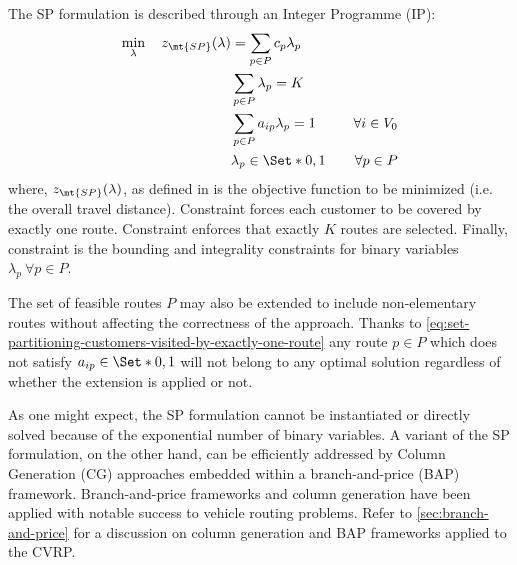 The SP formulation is described through an Integer Programme (IP):
\begin{align}
	\min_{\lambda} \quad z_\mt{SP}(\lambda) & = \sum_{p \in P}  c_p \lambda_p              & \label{eq:set-partitioning-obj-func}                                                       \\
	                                        & \sum_{p \in P} \lambda_{p} = K               & \label{eq:set-partitioning-K-routes}                                                       \\
	                                        & \sum_{p \in P}  a_{ip} \lambda_p = 1         & \quad \forall i \in V_0 \label{eq:set-partitioning-customers-visited-by-exactly-one-route} \\
	                                        & \lambda_p                    \in \Set*{0, 1} & \quad \forall p \in P \label{eq:set-partitioning-lambda-mip-var-bounds}
\end{align}
where, $z_\mt{SP}(\lambda)$, as defined in  is the objective function to be minimized (i.e. the overall travel distance).
Constraint  forces each customer to be covered by exactly one route.
Constraint  enforces that exactly $K$ routes are selected.
Finally, constraint  is the bounding and integrality constraints for binary variables $\lambda_p \ \forall p \in P$.

The set of feasible routes $P$ may also be extended to include non-elementary routes
without affecting the correctness of the approach.
Thanks to \cref{eq:set-partitioning-customers-visited-by-exactly-one-route}
any route $p \in P$ which does not satisfy $a_{ip} \in \Set*{0, 1}$
will not belong to any optimal solution
regardless of whether the extension is applied or not.

As one might expect, the SP formulation
cannot be instantiated or directly solved
because of the exponential number of binary variables.
A variant of the SP formulation, on the other hand,
can be efficiently addressed by Column Generation (CG) approaches
embedded within a branch-and-price (BAP) framework.
Branch-and-price frameworks and column generation have been applied
with notable success to vehicle routing problems.
Refer to \cref{sec:branch-and-price} for a discussion on
column generation and BAP frameworks applied to the CVRP.


